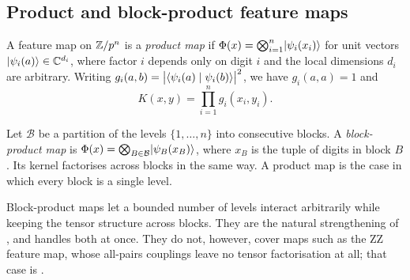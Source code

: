 \subsection{Product and block-product feature maps}

\begin{definition}
  \label{def:product-map}
  A feature map on $\mathbb{Z}/p^{n}$ is a \emph{product map} if
  $\Phi(x) = \bigotimes_{i=1}^{n} \lvert \psi_i(x_i) \rangle$ for unit vectors
  $\lvert \psi_i(a) \rangle \in \mathbb{C}^{d_i}$, where factor $i$ depends only on digit $i$ and the
  local dimensions $d_i$ are arbitrary. Writing
  $g_i(a,b) = \bigl\lvert\langle \psi_i(a) \mid \psi_i(b) \rangle\bigr\rvert^{2}$, we have $g_i(a,a) = 1$ and
  \begin{equation}
    \label{eq:multiplicative}
    K(x, y) = \prod_{i=1}^{n} g_i(x_i, y_i).
  \end{equation}
\end{definition}

\begin{definition}
  \label{def:block-product-map}
  Let $\mathcal{B}$ be a partition of the levels $\{1, \dots, n\}$ into consecutive
  blocks. A \emph{block-product map} is
  $\Phi(x) = \bigotimes_{B \in \mathcal{B}} \lvert \psi_B(x_B) \rangle$, where $x_B$ is the
  tuple of digits in block $B$. Its kernel factorises across blocks in the same way.
  A product map is the case in which every block is a single level.
\end{definition}

Block-product maps let a bounded number of levels interact arbitrarily while keeping
the tensor structure across blocks. They are the natural strengthening of
, and  handles both at once. They do not,
however, cover maps such as the ZZ feature map, whose all-pairs couplings leave no
tensor factorisation at all; that case is .
